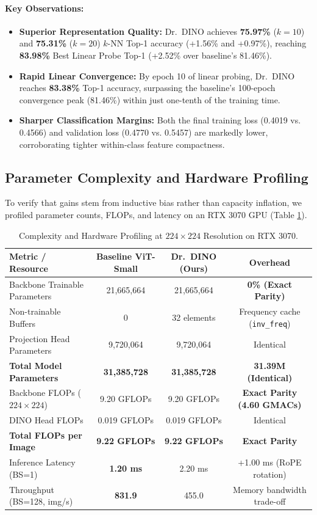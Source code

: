 \documentclass[11pt,a4paper]{article}
\begin{document}
\paragraph{Key Observations:}
\begin{itemize}[leftmargin=*]
    \item \textbf{Superior Representation Quality:} Dr.\ DINO achieves \textbf{75.97\%} ($k=10$) and \textbf{75.31\%} ($k=20$) $k$-NN Top-1 accuracy (+1.56\% and +0.97\%), reaching \textbf{83.98\%} Best Linear Probe Top-1 (+2.52\% over baseline's 81.46\%).
    \item \textbf{Rapid Linear Convergence:} By epoch 10 of linear probing, Dr.\ DINO reaches \textbf{83.38\%} Top-1 accuracy, surpassing the baseline's 100-epoch convergence peak (81.46\%) within just one-tenth of the training time.
    \item \textbf{Sharper Classification Margins:} Both the final training loss (0.4019 vs. 0.4566) and validation loss (0.4770 vs. 0.5457) are markedly lower, corroborating tighter within-class feature compactness.
\end{itemize}

\subsection{Parameter Complexity and Hardware Profiling}

To verify that gains stem from inductive bias rather than capacity inflation, we profiled parameter counts, FLOPs, and latency on an RTX 3070 GPU (Table \ref{tab:profiling}).

\begin{table}[ht]
\centering
\small
\caption{Complexity and Hardware Profiling at $224 \times 224$ Resolution on RTX 3070.}
\label{tab:profiling}
\begin{tabular}{lccc}
\toprule
\textbf{Metric / Resource} & \textbf{Baseline ViT-Small} & \textbf{Dr.\ DINO (Ours)} & \textbf{Overhead} \\
\midrule
Backbone Trainable Parameters & 21,665,664 & 21,665,664 & \textbf{0\% (Exact Parity)} \\
Non-trainable Buffers & 0 & 32 elements & Frequency cache (\texttt{inv\_freq}) \\
Projection Head Parameters & 9,720,064 & 9,720,064 & Identical \\
\textbf{Total Model Parameters} & \textbf{31,385,728} & \textbf{31,385,728} & \textbf{31.39M (Identical)} \\
\midrule
Backbone FLOPs ($224\times 224$) & 9.20 GFLOPs & 9.20 GFLOPs & \textbf{Exact Parity (4.60 GMACs)} \\
DINO Head FLOPs & 0.019 GFLOPs & 0.019 GFLOPs & Identical \\
\textbf{Total FLOPs per Image} & \textbf{9.22 GFLOPs} & \textbf{9.22 GFLOPs} & \textbf{Exact Parity} \\
\midrule
Inference Latency (BS=1) & \textbf{1.20 ms} & 2.20 ms & +1.00 ms (RoPE rotation) \\
Throughput (BS=128, img/s) & \textbf{831.9} & 455.0 & Memory bandwidth trade-off \\
\bottomrule
\end{tabular}
\end{table}
\end{document}
